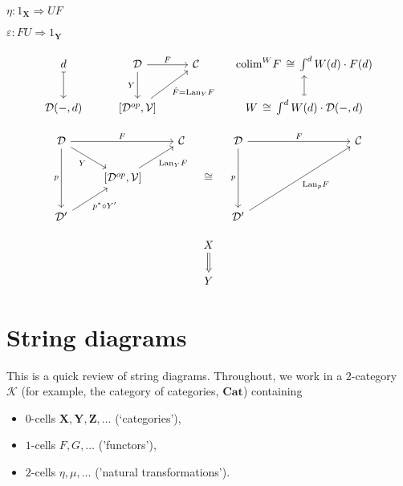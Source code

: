 \documentclass{article}
\numberwithin{equation}{section}
\theoremstyle{definition}
\newcommand{\cat}[1]{\mathbf{#1}}
\newcommand{\Cat}{\cat{Cat}}
\newcommand{\varcat}[1]{\mathbf{#1}}
\newcommand{\cX}{\varcat{X}}
\newcommand{\cY}{\varcat{Y}}
\newcommand{\cZ}{\varcat{Z}}
\newcommand{\cK}{\mathcal{K}}
\begin{document}
 $\eta: 1_{\mathbf{X}} \Rightarrow UF$

 $\varepsilon: FU \Rightarrow 1_{\mathbf{Y}}$

\[
	\begin{tikzcd}
		d \ar[d, mapsto]	& 	\mathcal{D} \ar[d, "Y"'] \ar[r, "F"]	&	\mathcal{C}	&	\text{colim}^W F \,\cong\, \int^d W(d) \cdot F(d) 
		\\
		\mathcal{D}(-,d) & {[\mathcal{D}^{op}, \mathcal{V}]} \ar[ur, "\hat{F} = \text{Lan}_Y F"'] & & W \,\cong\, \int^d W(d) \cdot \mathcal{D}(-,d) \ar[u, mapsto]
	\end{tikzcd}
\]	

\[
\begin{aligned}
	\begin{tikzcd}
		\mathcal{D} \ar[rr, "F"] \ar[dd, "p"'] \ar[dr, "Y"'] & & \mathcal{C} 
		\\
		& {[\mathcal{D}^{op}, \mathcal{V}]} \ar[ur, "\text{Lan}_Y F"'] &
		\\
		\mathcal{D}' \ar[ur, "p^* \circ Y' " '] & &
	\end{tikzcd}
\end{aligned}
\quad
\cong
\quad
\begin{aligned}
	\begin{tikzcd}
		\mathcal{D} \ar[rr, "F"] \ar[dd, "p"'] & & \mathcal{C} 
		\\
		& \phantom{[\mathcal{D}^{op}, \mathcal{V}]} &
		\\
		\mathcal{D}' \ar[uurr, "\text{Lan}_p F" '] & &
	\end{tikzcd}
\end{aligned}
\]	

\[
	\begin{tikzcd}
		X \ar[d, Rightarrow] \\ Y
	\end{tikzcd}
\]	

\pagebreak
\appendix
\section{String diagrams}
	This is a quick review of string diagrams. Throughout, we work in a $2$-category $\cK$ (for example, the category of categories, $\Cat$) containing
	\begin{itemize}
		\item $0$-cells $\cX,\cY,\cZ,\dots$  (`categories'),
		\item $1$-cells $F,G,\dots$ ('functors'),
		\item $2$-cells $\eta, \mu, \dots$ ('natural transformations').
	\end{itemize}
\end{document}
